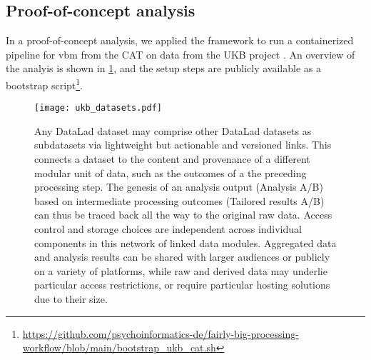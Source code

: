 \begin{Listing}
	\caption[Job orchestration for parallel processing]{Processing orchestration in a bash script.
		A batch system invokes it in a temporary working directory with three parameters:
		a URL of a source DataLad dataset,
		a URL to deposit job-results at, and
		an identifier to select a sample for processing.
		The job implementation conducts three main steps:
		1)~\texttt{clone} a DataLad dataset with all information to bootstrap an ephemeral computing environment for each job;
		2)~\texttt{containers-run} a containerized pipeline with a comprehensive specification of to-be-retrieved inputs and to-be-captured outputs;
		3)~\texttt{push} captured outputs (concurrency-safe; line 34) and process provenance records (not concurrency-safe, protected by a file lock; line 38) to a permanent storage location.
		Jobs are independent and can run in parallel. Potential job configurations can be supplied using batch system specific means (e.g., \texttt{DSLOCKFILE} and \texttt{JOBID} environment variables).
		Processing can be adjusted with the container invocation.}
	\label{lst:job}
\end{Listing}


\subsection{Proof-of-concept analysis}

In a proof-of-concept analysis, we applied the framework to run a containerized pipeline for \gls{vbm} \citep{ashburner2000voxel} from the \gls{CAT} \citep{gaser} on data from the UKB project \citep[][comprising 76 TB in 43 million files under strict usage constraints]{matthews2015uk}.
An overview of the analyis is shown in \cref{fig:fairly_datasets}, and the setup steps are publicly available as a bootstrap script\footnote{\url{https://github.com/psychoinformatics-de/fairly-big-processing-workflow/blob/main/bootstrap_ukb_cat.sh}}.

\begin{figure}
	\centering
	\texttt{[image: ukb\_datasets.pdf]}
	\caption[Overview of DataLad dataset linkage through processing and reuse]{Any DataLad dataset may comprise other DataLad datasets as subdatasets via lightweight but actionable and versioned links. This connects a dataset to the content and provenance of a different modular unit of data, such as the outcomes of a the preceding processing step. The genesis of an analysis output (Analysis A/B) based on intermediate processing outcomes (Tailored results A/B) can thus be traced back all the way to the original raw data. Access control and storage choices are independent across individual components in this network of linked data modules. Aggregated data and analysis results can be shared with larger audiences or publicly on a variety of platforms, while raw and derived data may underlie particular access restrictions, or require particular hosting solutions due to their size.}
	\label{fig:fairly_datasets}
\end{figure}

